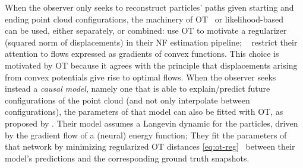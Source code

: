When the observer only seeks to reconstruct particles' paths given starting and ending point cloud configurations, the machinery of \acrlong{OT}~\citep{schiebinger2019optimal,yang2020predicting,yang2018scalable} or likelihood-based ~\citep{rezende2015variational,grathwohl2018ffjord} can be used, either separately, or combined: \citet{tong2020trajectorynet} use OT to motivate a regularizer (squared norm of displacements) in their NF estimation pipeline; ~\citet{huang2021convex} restrict their attention to flows expressed as gradients of convex functions. This choice is motivated by OT because it agrees with the \citet{brenier1987decomposition} principle that displacements arising from convex potentials give rise to optimal flows.
When the observer seeks instead a \textit{causal model}, namely one that is able to explain/predict future configurations of the point cloud (and not only interpolate between configurations), the parameters of that model can also be fitted with OT, as proposed by \citet{hashimoto2016learning}. Their model assumes a Langevin dynamic for the particles, driven by the gradient flow of a (neural) energy function; They fit the parameters of that network by minimizing regularized OT distances \eqref{eq:ot-reg}~\citep{cuturi2013sinkhorn} between their model's predictions and the corresponding ground truth snapshots. \\

